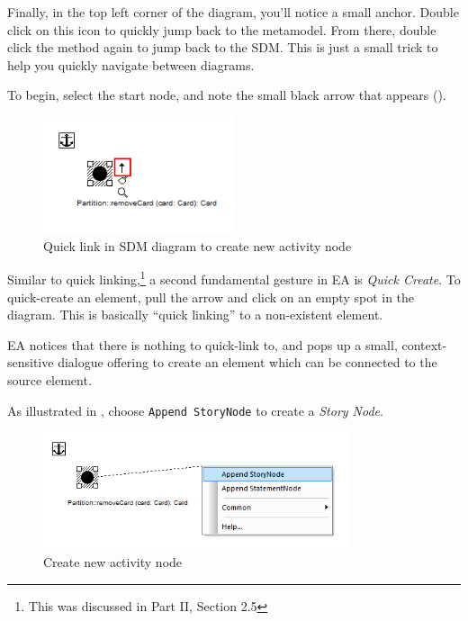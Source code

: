 \begin{stepbystep}
\item Finally, in the top left corner of the diagram, you'll notice a small anchor. Double click on this icon to quickly jump back to the
metamodel. From there, double click the method again to jump back to the SDM. This is just a small trick to help you quickly navigate between diagrams.

\newpage

\item To begin, select the start node, and note the small black arrow that appears (). 

\begin{figure}[htp]
\begin{center}
  \includegraphics[width=0.5\textwidth]{../../org.moflon.doc.handbook.03_storyDiagrams/03_removeCard/visRemImages/ea_sdmStartNode}
  \caption{Quick link in SDM diagram to create new activity node}  
  \label{ea:sdm_quicklink}
\end{center}
\end{figure}

\item Similar to quick linking,\footnote{This was discussed in Part II, Section 2.5} a second fundamental gesture in EA is \emph{Quick
Create}.
To quick-create an element, pull the arrow and click on an empty spot in the diagram. This is basically ``quick linking'' to a non-existent element.

\item EA notices that there is nothing to quick-link to, and pops up a small, context-sensitive dialogue offering to create an element
which can be connected to the source element.

\item As illustrated in , choose \texttt{Append StoryNode} to create a \emph{Story Node}.

\begin{figure}[htp]
\begin{center}
  \includegraphics[width=0.8\textwidth]{../../org.moflon.doc.handbook.03_storyDiagrams/03_removeCard/visRemImages/ea_sdmQuickLinkStoryNode}
  \caption{Create new activity node}  
  \label{ea:sdm_new_activity_node}
\end{center}
\end{figure}


\end{stepbystep}
